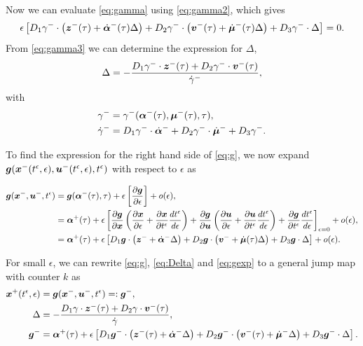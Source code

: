 \documentclass[../DC2019003Bouma.tex]{subfiles}
\begin{document}
Now we can evaluate \eqref{eq:gamma} using \eqref{eq:gamma2}, which gives
\begin{align}
\epsilon\left[ D_1 \gamma^{-}\cdot \left({\boldsymbol{z}}^{-}(\tau) + \dot{\boldsymbol{\alpha}}^{-}(\tau)\Delta\right) + D_2 \gamma^{-}\cdot  \left({\boldsymbol{v}}^{-}(\tau) + \dot{\boldsymbol{\mu}}^{-}(\tau) \Delta\right) + D_3 \gamma^{-}\cdot  \Delta \right] = 0. \label{eq:gamma3}
\end{align}
From \eqref{eq:gamma3} we can determine the expression for $\Delta$,
\begin{align}
\Delta = -\frac{D_1 \gamma^{-} \cdot {\boldsymbol{z}}^{-}(\tau) + D_2 \gamma^{-}\cdot {\boldsymbol{v}}^{-}(\tau)}{\dot{\gamma}^{-}}, \label{eq:Delta}
\end{align}
with
\begin{align}
\gamma^{-} &= \gamma^{-}(\boldsymbol{\alpha}^{-}(\tau),\boldsymbol{\mu}^{-}(\tau),\tau),\\
\dot{\gamma}^{-} &= D_1 \gamma^{-} \cdot \dot{\boldsymbol{\alpha}}^{-} + D_2 \gamma^{-}\cdot  \dot{\boldsymbol{\mu}}^{-} + D_3 \gamma^{-}.
\end{align}

To find the expression for the right hand side of \eqref{eq:g}, we now expand ${\boldsymbol{g}}({\boldsymbol{x}}^{-}(t^\epsilon,\epsilon),{\boldsymbol{u}}^{-}(t^\epsilon,\epsilon),t^\epsilon)$ with respect to $\epsilon$ as

\begin{align}
{\boldsymbol{g}}({\boldsymbol{x}}^{-},{\boldsymbol{u}}^{-},t^\epsilon) &= {\boldsymbol{g}}(\boldsymbol{\alpha}^-(\tau),\tau) + \epsilon\left[\frac{\partial{\boldsymbol{g}}}{\partial\epsilon}\right] + o(\epsilon),\\
&= \boldsymbol{\alpha}^+(\tau) + \epsilon\left[\frac{\partial{\boldsymbol{g}}}{\partial{\boldsymbol{x}}}\left(\frac{\partial{\boldsymbol{x}}}{\partial\epsilon} + \frac{\partial{\boldsymbol{x}}}{\partial t^\epsilon}\frac{dt^\epsilon}{d\epsilon} \right) + \frac{\partial{\boldsymbol{g}}}{\partial{\boldsymbol{u}}}\left(\frac{\partial{\boldsymbol{u}}}{\partial\epsilon} + \frac{\partial{\boldsymbol{u}}}{\partial t^\epsilon}\frac{d t^\epsilon}{d\epsilon}\right) + \frac{\partial{\boldsymbol{g}}}{\partial t^\epsilon}\frac{d t^\epsilon}{d\epsilon} \right]_{\epsilon = 0} + o(\epsilon),\\
&= \boldsymbol{\alpha}^+(\tau) + \epsilon\left[D_1{\boldsymbol{g}}\cdot \left({\boldsymbol{z}}^- + \dot{\boldsymbol{\alpha}}^-\Delta\right) + D_2{\boldsymbol{g}}\cdot \left({\boldsymbol{v}}^- + \dot{\boldsymbol{\mu}}(\tau) \Delta\right) + D_3{\boldsymbol{g}}\cdot \Delta\right] + o(\epsilon).\label{eq:gexp}
\end{align}

For small $\epsilon$, we can rewrite \eqref{eq:g}, \eqref{eq:Delta} and \eqref{eq:gexp} to a general jump map with counter $k$ as
\begin{align}
{\boldsymbol{x}}^{+}(t^\epsilon,\epsilon) &= {\boldsymbol{g}}({\boldsymbol{x}}^{-},{\boldsymbol{u}}^{-},t^\epsilon)=:{\boldsymbol{g}}^-,\label{eq:gmulti}\\
\Delta &= -\frac{D_1 \gamma\cdot {\boldsymbol{z}}^-(\tau) + D_2 \gamma\cdot {\boldsymbol{v}}^-(\tau)}{\dot{\gamma}}, \label{eq:Deltamulti}\\
{\boldsymbol{g}}^- &= \boldsymbol{\alpha}^+(\tau) + \epsilon\left[D_1{\boldsymbol{g}}^-\cdot \left({\boldsymbol{z}}^- (\tau) + \dot{\boldsymbol{\alpha}}^{-}\Delta \right) + D_2{\boldsymbol{g}}^-\cdot \left({\boldsymbol{v}}^- (\tau) + \dot{\boldsymbol{\mu}}^-\Delta \right) + D_3{\boldsymbol{g}}^-\cdot \Delta \right].\label{eq:gexpmulti}
\end{align}
\end{document}
